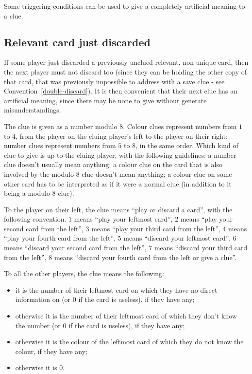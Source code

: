 \documentclass[a4paper]{article}
\theoremstyle{plain}
\theoremstyle{definition}
\begin{document}
Some triggering conditions can be used to give a completely artificial meaning to a clue.

\subsection{Relevant card just discarded}

If some player just discarded a previously unclued relevant, non-unique card, then the next player must not discard too (since they can be holding the other copy of that card, that was previously impossible to address with a save clue - see Convention~\ref{double-discard}). It is then convenient that their next clue has an artificial meaning, since there may be none to give without generate misunderstandings.

The clue is given as a number modulo 8. Colour clues represent numbers from $1$ to $4$, from the player on the cluing player's left to the player on their right; number clues represent numbers from $5$ to $8$, in the same order. Which kind of clue to give is up to the cluing player, with the following guidelines: a number clue doesn't usually mean anything; a colour clue on the card that is also involved by the modulo 8 clue doesn't mean anything; a colour clue on some other card has to be interpreted as if it were a normal clue (in addition to it being a modulo 8 clue).

To the player on their left, the clue means ``play or discard a card'', with the following convention. $1$ means ``play your leftmost card'', $2$ means ``play your second card from the left'', $3$ means ``play your third card from the left'', $4$ means ``play your fourth card from the left'', $5$ means ``discard your leftmost card'', $6$ means ``discard your second card from the left'', $7$ means ``discard your third card from the left'', $8$ means ``discard your fourth card from the left or give a clue''.

To all the other players, the clue means the following:

\begin{itemize}
	\item it is the number of their leftmost card on which they have no direct information on (or $0$ if the card is useless), if they have any;
	\item otherwise it is the number of their leftmost card of which they don't know the number (or $0$ if the card is useless), if they have any;
	\item otherwise it is the colour of the leftmost card of which they do not know the colour, if they have any;
	\item otherwise it is $0$. 
\end{itemize}
\end{document}
